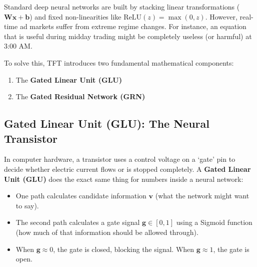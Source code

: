 \documentclass[11pt,a4paper]{article}
\begin{document}
Standard deep neural networks are built by stacking linear transformations ($\mathbf{W}\mathbf{x} + \mathbf{b}$) and fixed non-linearities like $\text{ReLU}(z) = \max(0, z)$. However, real-time ad markets suffer from extreme regime changes. For instance, an equation that is useful during midday trading might be completely useless (or harmful) at 3:00 AM. 

To solve this, TFT introduces two fundamental mathematical components:
\begin{enumerate}
    \item The \textbf{Gated Linear Unit (GLU)}
    \item The \textbf{Gated Residual Network (GRN)}
\end{enumerate}

\subsection{Gated Linear Unit (GLU): The Neural Transistor}

\begin{intuitionbox}
In computer hardware, a transistor uses a control voltage on a `gate' pin to decide whether electric current flows or is stopped completely.
A \textbf{Gated Linear Unit (GLU)} does the exact same thing for numbers inside a neural network:
\begin{itemize}
    \item One path calculates candidate information $\mathbf{v}$ (what the network might want to say).
    \item The second path calculates a gate signal $\mathbf{g} \in [0, 1]$ using a Sigmoid function (how much of that information should be allowed through).
    \item When $\mathbf{g} \approx 0$, the gate is closed, blocking the signal. When $\mathbf{g} \approx 1$, the gate is open.
\end{itemize}
\end{intuitionbox}
\end{document}
